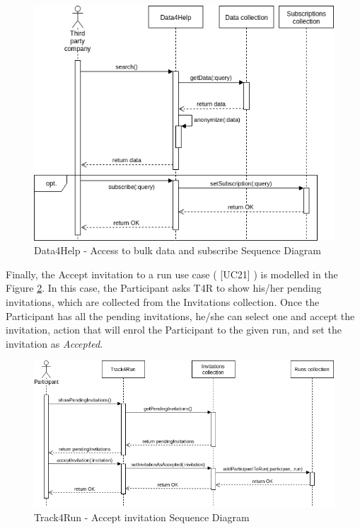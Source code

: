 \documentclass[12pt]{report}
\newcommand\usecase[1]{ [UC#1] }
\begin{document}
\begin{figure}[H]
\centering
	\includegraphics[scale=0.6]{Diagrams/d4h_seq_subscribe_to_bulk_query.png}
\caption[Data4Help - Access to bulk data and subscribe Sequence Diagram]{Data4Help - Access to bulk data and subscribe Sequence Diagram}
\label{fig:d4h_seq_bulk_data}
\end{figure}

Finally, the Accept invitation to a run use case (\usecase{21}) is modelled in the Figure \ref{fig:t4r_accept_invitation}. In this case, the Participant asks T4R to show his/her pending invitations, which are collected from the Invitations collection. Once the Participant has all the pending invitations, he/she can select one and accept the invitation, action that will enrol the Participant to the given run, and set the invitation as \textit{Accepted}.

\begin{figure}[H]
\centering
	\includegraphics[scale=0.6]{Diagrams/t4r_seq_accept_invitation.png}
\caption[Track4Run - Accept invitation Sequence Diagram]{Track4Run - Accept invitation Sequence Diagram}
\label{fig:t4r_accept_invitation}
\end{figure}
\end{document}
